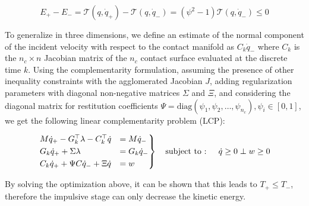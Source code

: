 \begin{equation}
    E _{+} - E _{-} = \mathcal{T}(q, \dot{q} _{+}) - \mathcal{T}(q, \dot{q} _{-}) = (\psi ^2 - 1) \mathcal{T}(q, \dot{q} _{-}) \leq 0
\end{equation}

To generalize in three dimensions, we define an estimate of the normal component of the incident velocity with respect to the contact manifold as $C _k \dot{q} _{-}$ where $C _k$ is the $n _c \times n$ Jacobian matrix of the $n _c$ contact surface evaluated at the discrete time $k$. Using the complementarity formulation, assuming the presence of other inequality constraints with the agglomerated Jacobian $J$, adding regularization parameters with diagonal non-negative matrices $\Sigma$ and $\Xi$, and considering the diagonal matrix for restitution coefficients $\Psi = \text{diag}(\psi _1, \psi _2, \dots, \psi _{n _c}),  \psi _i \in [0, 1]$, we get the following linear complementarity problem (LCP):

\begin{equation}
    \begin{rcases}
        M\dot{q} _{+} - G ^\top _k \lambda - C ^\top _k \dot{q} & = M \dot{q} _{-}    \\
        G _k \dot{q} _{+} + \Sigma \lambda                      & = G _k \dot{q} _{-} \\
        C _k \dot{q} _{+} + \Psi C \dot{q} _{-} + \Xi \dot{q}   & = w                 \\
    \end{rcases} \quad \text{subject to
        :  } \quad \dot{q} \geq 0 \perp w \geq 0
\end{equation}

By solving the optimization above, it can be shown that this leads to $T _{+} \leq T _{-}$, therefore the impulsive stage can only decrease the kinetic energy.
